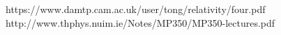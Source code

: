\documentclass[conference]{IEEEtran}
\begin{document}

\begin{thebibliography}{00}
 https://www.damtp.cam.ac.uk/user/tong/relativity/four.pdf
 http://www.thphys.nuim.ie/Notes/MP350/MP350-lectures.pdf
\end{thebibliography}
\end{document}

